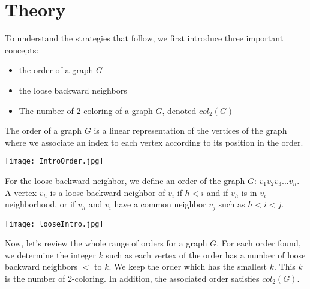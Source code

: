 \chapter{Theory}

To understand the strategies that follow, we first introduce three important concepts:
\begin{itemize}
\item the order of a graph $G$
\item the loose backward neighbors
\item The number of 2-coloring of a graph $G$, denoted $col_{2}(G)$
\end{itemize}

The order of a graph $G$ is a linear representation of the vertices of the graph where we associate an index to each vertex according to its position in the order.

\texttt{[image: IntroOrder.jpg]}

For the loose backward neighbor, we define an order of the graph $G$: $v_{1} v_{2} v_{3}... v_{n}$. A vertex $v_{h}$ is a loose backward neighbor of $v_{i}$ if $h < i$ and if $v_{h}$ is in $v_{i}$ neighborhood, or if $v_{h}$ and $v_{i}$ have a common neighbor $v_{j}$ such as $ h < i < j$.

\texttt{[image: looseIntro.jpg]}

Now, let's review the whole range of orders for a graph $G$. For each order found, we determine the integer $k$ such as each vertex of the order has a number of loose backward neighbors $<$ to $k$. We keep the order which has the smallest $k$. This $k$ is the number of 2-coloring. In addition, the associated order satisfies $col_{2}(G)$.





